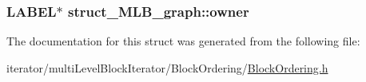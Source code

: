\label{structstruct__MLB__graph_a7eb36bae724d139d7fc21d94e6199cfc}
\hypertarget{structstruct__MLB__graph_a10be24e6c4971235fd9fbb8b2216d749}{
\subsubsection[{owner}]{\setlength{\rightskip}{0pt plus 5cm}LABEL$\ast$ {\bf struct\_\-MLB\_\-graph::owner}}}
\label{structstruct__MLB__graph_a10be24e6c4971235fd9fbb8b2216d749}


The documentation for this struct was generated from the following file:\begin{DoxyCompactItemize}
\item 
iterator/multiLevelBlockIterator/BlockOrdering/\hyperlink{BlockOrdering_8h}{BlockOrdering.h}\end{DoxyCompactItemize}
